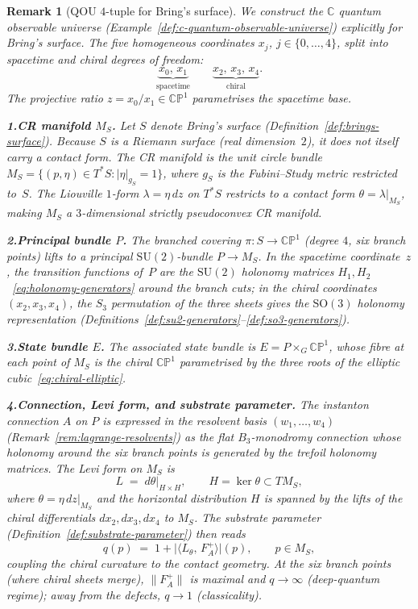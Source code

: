 \documentclass[12pt,a4paper]{report}
\newtheorem{remark}[theorem]{Remark}
\begin{document}
\begin{remark}[QOU $4$-tuple for Bring's surface]
\label{rem:brings-qou-4tuple}
We construct the $\mathbb{C}$ quantum observable universe
(Example~\ref{def:c-quantum-observable-universe}) explicitly for Bring's
surface.  The five homogeneous coordinates $x_j$, $j\in\{0,\dots,4\}$,
split into \emph{spacetime} and \emph{chiral} degrees of freedom:
\[
  \underbrace{x_0,\, x_1}_{\text{spacetime}}
  \qquad
  \underbrace{x_2,\, x_3,\, x_4}_{\text{chiral}}.
\]
The projective ratio $z = x_0/x_1 \in \mathbb{CP}^1$ parametrises the
spacetime base.

\medskip
\noindent\textbf{1.\;CR manifold $M_S$.}\;
Let $S$ denote Bring's surface (Definition~\ref{def:brings-surface}).
Because $S$ is a Riemann surface (real dimension~$2$), it does not itself
carry a contact form.  The CR manifold is the unit circle bundle
$M_S = \{(p,\eta) \in T^*S : \lvert\eta\rvert_{g_S} = 1\}$,
where $g_S$ is the Fubini--Study metric restricted to~$S$.  The Liouville
$1$-form $\lambda = \eta\,dz$ on $T^*S$ restricts to a contact form
$\theta = \lambda\big|_{M_S}$, making $M_S$ a $3$-dimensional strictly
pseudoconvex CR manifold.

\medskip
\noindent\textbf{2.\;Principal bundle $P$.}\;
The branched covering $\pi\colon S \to \mathbb{CP}^1$ (degree $4$, six
branch points) lifts to a principal $\mathrm{SU}(2)$-bundle
$P \to M_S$.  In the spacetime coordinate~$z$, the transition functions
of~$P$ are the $\mathrm{SU}(2)$ holonomy matrices
$H_1,H_2$~\eqref{eq:holonomy-generators} around the branch cuts; in the
chiral coordinates $(x_2,x_3,x_4)$, the $S_3$ permutation of the three
sheets gives the $\mathrm{SO}(3)$ holonomy representation
(Definitions~\ref{def:su2-generators}--\ref{def:so3-generators}).

\medskip
\noindent\textbf{3.\;State bundle $E$.}\;
The associated state bundle is $E = P \times_G \mathbb{CP}^1$,
whose fibre at each point of $M_S$ is the chiral
$\mathbb{CP}^1$ parametrised by the three roots of the elliptic
cubic~\eqref{eq:chiral-elliptic}.

\medskip
\noindent\textbf{4.\;Connection, Levi form, and substrate parameter.}\;
The instanton connection $A$ on $P$ is expressed in the resolvent basis
$(w_1,\dots,w_4)$ (Remark~\ref{rem:lagrange-resolvents}) as the flat
$B_3$-monodromy connection whose holonomy around the six branch points is
generated by the trefoil holonomy matrices.  The Levi form on $M_S$ is
\[
  L \;=\; d\theta\big|_{H \times H},
  \qquad H = \ker\theta \subset TM_S,
\]
where $\theta = \eta\,dz\big|_{M_S}$ and the horizontal distribution $H$ is
spanned by the lifts of the chiral differentials $dx_2, dx_3, dx_4$ to
$M_S$.  The substrate parameter
(Definition~\ref{def:substrate-parameter}) then reads
\[
  q(p) \;=\; 1 + \lvert\langle L_\theta,\, F_A^+ \rangle\rvert(p),
  \qquad p \in M_S,
\]
coupling the chiral curvature to the contact geometry.  At the six branch
points (where chiral sheets merge), $\lVert F_A^+\rVert$ is maximal and
$q \to \infty$ (deep-quantum regime); away from the defects,
$q \to 1$ (classicality).


\end{remark}
\end{document}
